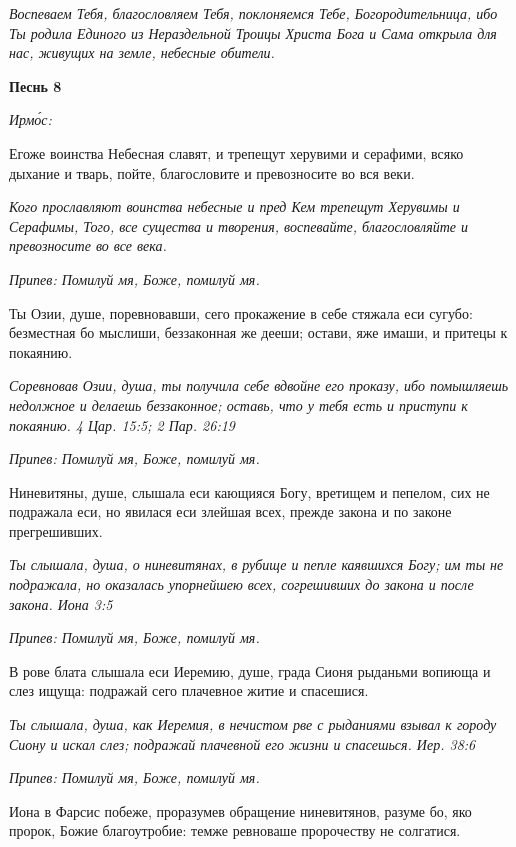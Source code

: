 \itshape Воспеваем Тебя, благословляем Тебя, поклоняемся Тебе, Богородительница, ибо Ты родила Единого из Нераздельной Троицы Христа Бога и Сама открыла для нас, живущих на земле, небесные обители.\normalfont{}





\bfseries Песнь 8\normalfont{}


\itshape Ирмо́с:\normalfont{}


Егоже воинства Небесная славят, и трепещут херувими и серафими, всяко дыхание и тварь, пойте, благословите и превозносите во вся веки.


\itshape Кого прославляют воинства небесные и пред Кем трепещут Херувимы и Серафимы, Того, все существа и творения, воспевайте, благословляйте и превозносите во все века.\normalfont{}


\itshape Припев:\normalfont{} Помилуй мя, Боже, помилуй мя.


Ты Озии, душе, поревновавши, сего прокажение в себе стяжала еси сугубо: безместная бо мыслиши, беззаконная же дееши; остави, яже имаши, и притецы к покаянию.


\itshape Соревновав Озии, душа, ты получила себе вдвойне его проказу, ибо помышляешь недолжное и делаешь беззаконное; оставь, что у тебя есть и приступи к покаянию. 4 Цар. 15:5; 2 Пар. 26:19\normalfont{}


\itshape Припев:\normalfont{} Помилуй мя, Боже, помилуй мя.


Ниневитяны, душе, слышала еси кающияся Богу, вретищем и пепелом, сих не подражала еси, но явилася еси злейшая всех, прежде закона и по законе прегрешивших.


\itshape Ты слышала, душа, о ниневитянах, в рубище и пепле каявшихся Богу; им ты не подражала, но оказалась упорнейшею всех, согрешивших до закона и после закона. Иона 3:5\normalfont{}


\itshape Припев:\normalfont{} Помилуй мя, Боже, помилуй мя.


В рове блата слышала еси Иеремию, душе, града Сионя рыданьми вопиюща и слез ищуща: подражай сего плачевное житие и спасешися.


\itshape Ты слышала, душа, как Иеремия, в нечистом рве с рыданиями взывал к городу Сиону и искал слез; подражай плачевной его жизни и спасешься. Иер. 38:6\normalfont{}


\itshape Припев:\normalfont{} Помилуй мя, Боже, помилуй мя.


Иона в Фарсис побеже, проразумев обращение ниневитянов, разуме бо, яко пророк, Божие благоутробие: темже ревноваше пророчеству не солгатися.



